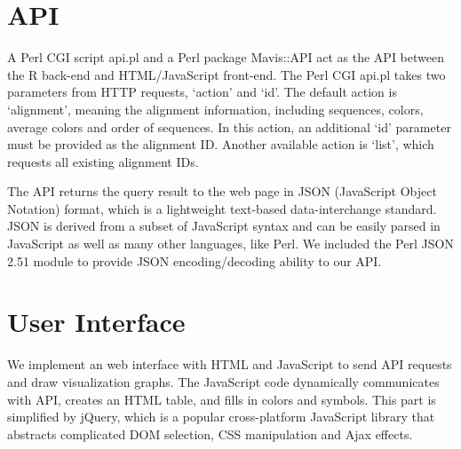 \section{API}

A Perl CGI script api.pl and a Perl package Mavis::API act as the API between the R back-end and HTML/JavaScript front-end. The Perl CGI api.pl takes two parameters from HTTP requests, ‘action’ and ‘id’. The default action is ‘alignment’, meaning the alignment information, including sequences, colors, average colors and order of sequences. In this action, an additional ‘id’ parameter must be provided as the alignment ID. Another available action is ‘list’, which requests all existing alignment IDs.

The API returns the query result to the web page in JSON (JavaScript Object Notation) format, which is a lightweight text-based data-interchange standard. JSON is derived from a subset of JavaScript syntax and can be easily parsed in JavaScript as well as many other languages, like Perl. We included the Perl JSON 2.51 module to provide JSON encoding/decoding ability to our API.

\section{User Interface}

We implement an web interface with HTML and JavaScript to send API requests and draw visualization graphs. The JavaScript code dynamically communicates with API, creates an HTML table, and fills in colors and symbols. This part is simplified by jQuery, which is a popular cross-platform JavaScript library that abstracts complicated DOM selection, CSS manipulation and Ajax effects.